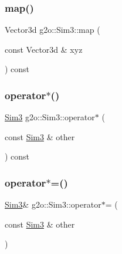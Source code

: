 \mbox{\label{structg2o_1_1_sim3_a577ba985864cab536688123df6063b39}} 
\subsubsection{\texorpdfstring{map()}{map()}}
{\footnotesize\ttfamily Vector3d g2o\+::\+Sim3\+::map (\begin{DoxyParamCaption}\item[{const Vector3d \&}]{xyz }\end{DoxyParamCaption}) const\hspace{0.3cm}{\ttfamily [inline]}}

\mbox{\label{structg2o_1_1_sim3_a6bf3dee27d6c5e634c7c07974bf59d39}} 
\subsubsection{\texorpdfstring{operator$\ast$()}{operator*()}}
{\footnotesize\ttfamily \mbox{\hyperlink{structg2o_1_1_sim3}{Sim3}} g2o\+::\+Sim3\+::operator$\ast$ (\begin{DoxyParamCaption}\item[{const \mbox{\hyperlink{structg2o_1_1_sim3}{Sim3}} \&}]{other }\end{DoxyParamCaption}) const\hspace{0.3cm}{\ttfamily [inline]}}

\mbox{\label{structg2o_1_1_sim3_aaad597f4a82aef284896be4c6a79aeb9}} 
\subsubsection{\texorpdfstring{operator$\ast$=()}{operator*=()}}
{\footnotesize\ttfamily \mbox{\hyperlink{structg2o_1_1_sim3}{Sim3}}\& g2o\+::\+Sim3\+::operator$\ast$= (\begin{DoxyParamCaption}\item[{const \mbox{\hyperlink{structg2o_1_1_sim3}{Sim3}} \&}]{other }\end{DoxyParamCaption})\hspace{0.3cm}{\ttfamily [inline]}}

